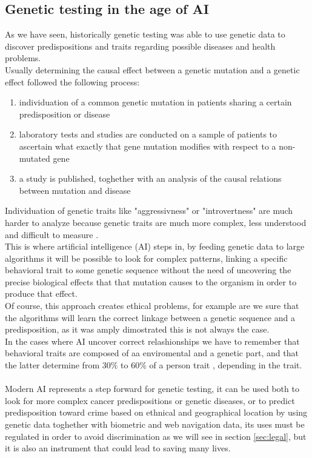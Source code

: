 \documentclass[12pt]{article}
\begin{document}
\subsection{Genetic testing in the age of AI}
As we have seen, historically genetic testing was able to use genetic data to discover predispositions and traits regarding possible diseases and health problems. \\
Usually determining the causal effect between a genetic mutation and a genetic effect followed the following process:
\begin{enumerate}
    \item individuation of a common genetic mutation in patients sharing a certain predisposition or disease
    \item laboratory tests and studies are conducted on a sample of patients to ascertain what exactly that gene mutation modifies with respect to a non-mutated gene
    \item a study is published, toghether with an analysis of the causal relations between mutation and disease
\end{enumerate}
Individuation of genetic traits like "aggressivness" or "introvertness" are much harder to analyze because genetic traits are much more complex, less understood and difficult to measure \cite{behavioral_genetics_nature}.\\
This is where artificial intelligence (AI) steps in, by feeding genetic data to large algorithms it will be possible to look for complex patterns, linking a specific behavioral trait to some genetic sequence without the need of uncovering 
the precise biological effects that that mutation causes to the organism in order to produce that effect.\\
Of course, this approach creates ethical problems, for example are we sure that the algorithms will learn the correct linkage between a genetic sequence and a predisposition, as it was amply dimostrated this is not always the case.\\
In the cases where AI uncover correct relashionships we have to remember that behavioral traits are composed of aa enviromental and a genetic part, and that the latter determine from $30\%$ to $60\%$ of a person trait \cite{behavioral_genetics_nature}, depending in the trait.\\
\\
Modern AI represents a step forward for genetic testing, it can be used both to look for more complex cancer predispositions or genetic diseases, or to predict predisposition toward crime based on ethnical and geographical location by using genetic data toghether with biometric and web navigation data, 
its uses must be regulated in order to avoid discrimination as we will see in section \ref{sec:legal}, but it is also an instrument that could lead to saving many lives.
\end{document}
